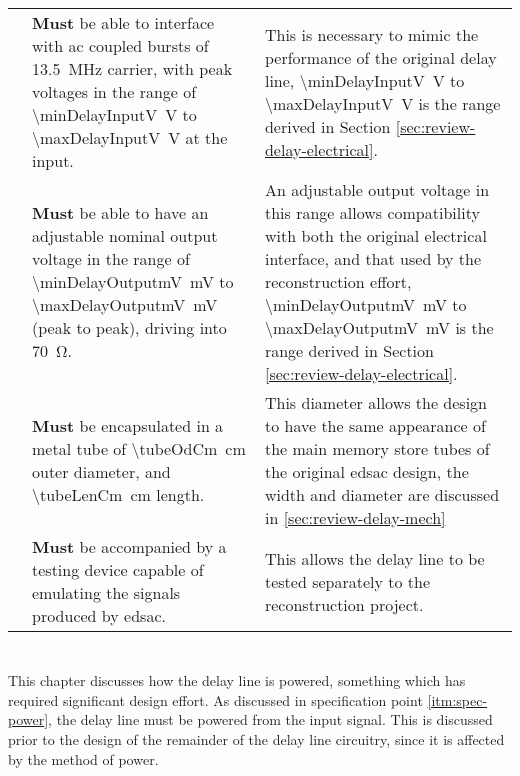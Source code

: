 \begin{longtable}{r  >{\raggedright}p{}  >{\raggedright}p{} }
	{specNo}\thespecNo\label{itm:spec-skew-input-v} & \textbf{Must} be able to interface with \gls{ac} coupled bursts of \SI{13.5}{\mega\hertz} carrier, with peak voltages in the range of \SI{\minDelayInputV}{\volt} to \SI{\maxDelayInputV}{\volt} at the input. & This is necessary to mimic the performance of the original delay line, \SI{\minDelayInputV}{\volt} to \SI{\maxDelayInputV}{\volt} is the range derived in Section \ref{sec:review-delay-electrical}. \tabularnewline
	
	{specNo}\thespecNo\label{itm:spec-skew-output-v} & \textbf{Must} be able to have an adjustable nominal output voltage in the range of \SI{\minDelayOutputmV}{\milli\volt} to \SI{\maxDelayOutputmV}{\milli\volt} (peak to peak), driving into \SI{70}{\ohm}. & An adjustable output voltage in this range allows compatibility with both the original electrical interface, and that used by the reconstruction effort, \SI{\minDelayOutputmV}{\milli\volt} to \SI{\maxDelayOutputmV}{\milli\volt} is the range derived in Section \ref{sec:review-delay-electrical}. \tabularnewline
	
	{specNo}\thespecNo\label{itm:spec-phys-size} & \textbf{Must} be encapsulated in a metal tube of \SI{\tubeOdCm}{\centi\metre} outer diameter, and \SI{\tubeLenCm}{\centi\metre} length. & This diameter allows the design to have the same appearance of the main memory store tubes of the original \gls{edsac} design, the width and diameter are discussed in \ref{sec:review-delay-mech} \tabularnewline
	
	{specNo}\thespecNo\label{itm:spec-testing} & \textbf{Must} be accompanied by a testing device capable of emulating the signals produced by \gls{edsac}. & This allows the delay line to be tested separately to the reconstruction project. \tabularnewline
	
	
\end{longtable}

\chapter{} \label{sec:power}

This chapter discusses how the delay line is powered, something which has required significant design effort. As discussed in specification point \ref{itm:spec-power}, the delay line must be powered from the input signal. This is discussed prior to the design of the remainder of the delay line circuitry, since it is affected by the method of power.

